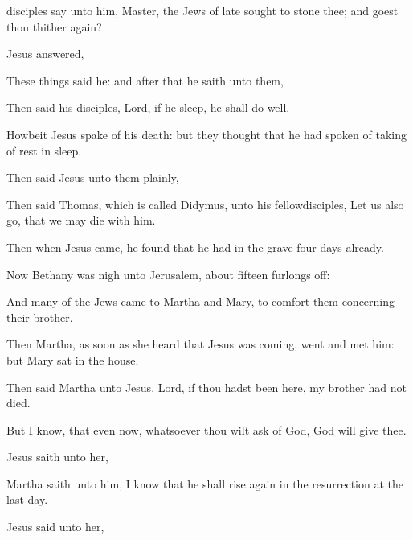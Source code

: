 {
disciples
say unto
him,
Master, the
Jews of
late
sought to
stone
thee;
and goest
thou
thither
again?

Jesus
answered,
{}


These
things said
he:
and
after
that he
saith unto
them,
{}

Then
said
his
disciples,
Lord,
if he
sleep, he shall do
well.

Howbeit
Jesus
spake
of
his
death:
but
they
thought
that he had
spoken
of taking of
rest in
sleep.

Then
said
Jesus unto
them
plainly,
{}


Then
said
Thomas, which is
called
Didymus, unto his
fellowdisciples,
Let
us
also
go,
that we may
die
with
him.

Then
when
Jesus
came,
he found
that he
had
{}
in the
grave
four
days
already.

Now
Bethany
was nigh
unto
Jerusalem,
about
fifteen
furlongs
off:

And
many
of the
Jews
came
to
Martha
and
Mary,
to
comfort
them
concerning
their
brother.

Then
Martha, as soon
as she
heard
that
Jesus was
coming, went and
met
him:
but
Mary
sat
{}
in the
house.

Then
said
Martha
unto
Jesus,
Lord,
if thou hadst
been
here,
my
brother
had
not
died.

But I
know,
that even
now,
whatsoever thou wilt
ask of
God,
God will
give
{}
thee.

Jesus
saith unto
her,
{}

Martha
saith unto
him, I
know
that he shall rise
again
in the
resurrection
at the
last
day.

Jesus
said unto
her,
{}

}
